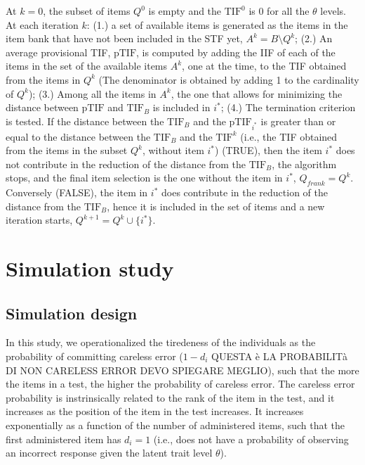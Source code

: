 \documentclass{svproc}
\begin{document}
At $k = 0$, the subset of items $Q^0$ is empty and the $\text{TIF}^0$ is 0 for all the $\theta$ levels. 
At each iteration $k$: (1.) a set of available items is generated as the items in the item bank that have not been included in the STF yet, $A^k = B \setminus Q^k$; (2.)
An average provisional TIF, $\text{pTIF}$, is computed by adding the IIF of each of the items in the set of the available items $A^k$, one at the time, to the TIF obtained from the items in $Q^k$ (The denominator is obtained by adding 1 to the cardinality of $Q^k$); (3.) Among all the items in $A^k$, the one that allows for minimizing the distance between $\text{pTIF}$ and $\text{TIF}_B$ is included in $i^*$; (4.) 
The termination criterion is tested. 
If the distance between the $\text{TIF}_B$ and the $\text{pTIF}_{i^*}$ is greater than or equal to the distance between the $\text{TIF}_B$ and the $\text{TIF}^k$ (i.e., the TIF obtained from the items in the subset $Q^k$, without item $i^*$) (TRUE), then the item $i^*$ does not contribute in the reduction of the distance from the $\text{TIF}_B$, the algorithm stops, and the final item selection is the one without the item in $i^*$, $Q_{frank} = Q^k$. Conversely (FALSE), the item in $i^*$ does contribute in the reduction of the distance from the $\text{TIF}_B$, hence it is included in the set of items and a new iteration starts, $Q^{k+1} = Q^k \cup \{i^*\}$.

\section{Simulation study}

\subsection{Simulation design}

In this study, we operationalized the tiredeness of the individuals as the probability of committing careless error ($1- d_i$ QUESTA è LA PROBABILITà DI NON CARELESS ERROR DEVO SPIEGARE MEGLIO), such that the more the items in a test, the higher the probability of careless error. 
The careless error probability is instrinsically related to the rank of the item in the test, and it increases as the position of the item in the test increases. It increases exponentially as a function of the number of administered items, such that the first administered item has $d_i = 1$ (i.e., does not have a probability of observing an incorrect response given the latent trait level $\theta$).
\end{document}
